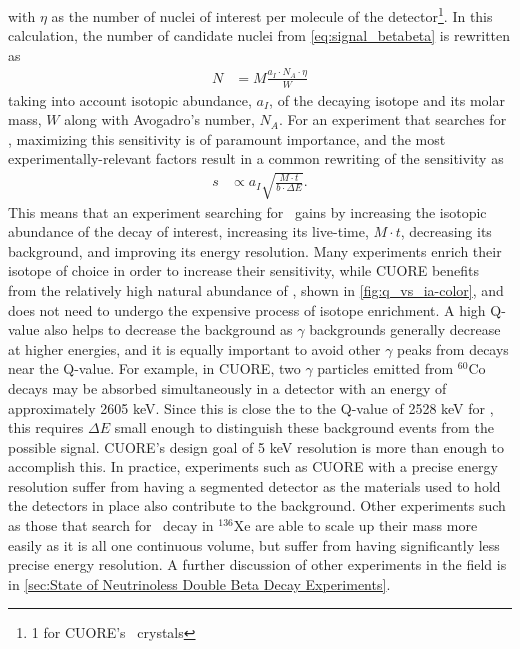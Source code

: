 with $\eta$ as the number of nuclei of interest per molecule of the detector\footnote{1 for CUORE's \teotwo~crystals}.
In this calculation, the number of candidate nuclei from \autoref{eq:signal_betabeta} is rewritten as
\begin{align}
    N &=M\frac{a_I \cdot N_A\cdot \eta}{W}
\end{align}
taking into account isotopic abundance, $a_I$, of the decaying isotope and its molar mass, $W$ along with Avogadro's number, $N_A$.
For an experiment that searches for \zeronubb, maximizing this sensitivity is of paramount importance, and the most experimentally-relevant factors result in a common rewriting of the sensitivity as
\begin{align}
s &\propto a_I \sqrt{\frac{M \cdot t}{b \cdot \Delta E}}.
\label{eq:sensitivity_short}
\end{align}
This means that an experiment searching for \zeronubb~gains by increasing the isotopic abundance of the decay of interest, increasing its live-time, $M\cdot t$, decreasing its background, and improving its energy resolution.
Many experiments enrich their isotope of choice in order to increase their sensitivity, while CUORE benefits from the relatively high natural abundance of \teonethirty, shown in \autoref{fig:q_vs_ia-color}, and does not need to undergo the expensive process of isotope enrichment.
A high Q-value also helps to decrease the background as $\gamma$ backgrounds generally decrease at higher energies, and it is equally important to avoid other $\gamma$ peaks from decays near the Q-value.
For example, in CUORE, two $\gamma$ particles emitted from $^{60}\textrm{Co}$ decays may be absorbed simultaneously in a detector with an energy of approximately 2605 keV.
Since this is close the to the Q-value of 2528 keV for \teonethirty, this requires $\Delta E$ small enough to distinguish these background events from the possible signal.
CUORE's design goal of 5 keV resolution is more than enough to accomplish this.
In practice, experiments such as CUORE with a precise energy resolution suffer from having a segmented detector as the materials used to hold the detectors in place also contribute to the background.
Other experiments such as those that search for \zeronubb~decay in $^{136}$Xe are able to scale up their mass more easily  as it is all one continuous volume, but suffer from having significantly less precise energy resolution.
A further discussion of other experiments in the field is in \autoref{sec:State of Neutrinoless Double Beta Decay Experiments}.
